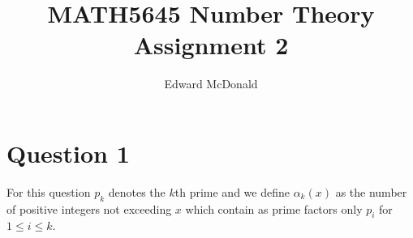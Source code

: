 \documentclass[10pt]{article}
\title{MATH5645 Number Theory Assignment 2}
\author{Edward McDonald}
\date{}
\begin{document}
\maketitle{}
\section*{Question 1}
For this question $p_k$ denotes the $k$th prime
and we define $\alpha_k(x)$ as the number of positive integers
not exceeding $x$ which contain as prime factors
only $p_i$ for $1\leq i \leq k$.


\end{document}
